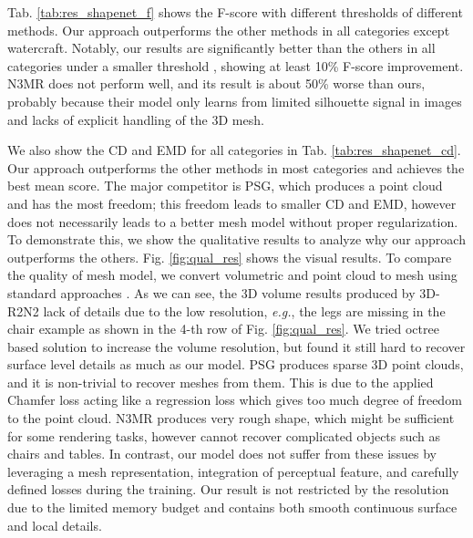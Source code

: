 \documentclass[runningheads]{llncs}
\def\eg{\emph{e.g.}}
\newcommand{\figref}[1]{Fig. \ref{#1}}
\newcommand{\tabref}[1]{Tab. \ref{#1}}
\begin{document}
\tabref{tab:res_shapenet_f} shows the F-score with different thresholds of different methods. Our approach outperforms the other methods in all categories except watercraft. Notably, our results are significantly better than the others in all categories under a smaller threshold , showing at least 10\% F-score improvement.
N3MR does not perform well, and its result is about 50\% worse than ours, probably because their model only learns from limited silhouette signal in images and lacks of explicit handling of the 3D mesh.



We also show the CD and EMD for all categories in \tabref{tab:res_shapenet_cd}. Our approach outperforms the other methods in most categories and achieves the best mean score. The major competitor is PSG, which produces a point cloud and has the most freedom; this freedom leads to smaller CD and EMD, however does not necessarily leads to a better mesh model without proper regularization. To demonstrate this, we show the qualitative results to analyze why our approach outperforms the others.
\figref{fig:qual_res} shows the visual results. To compare the quality of mesh model, we convert volumetric and point cloud to mesh using standard approaches \cite{LorensenC87,BernardiniMRST99}. As we can see, the 3D volume results produced by 3D-R2N2 lack of details due to the low resolution, \eg, the legs are missing in the chair example as shown in the 4-th row of \figref{fig:qual_res}. We tried octree based solution \cite{TatarchenkoDB17} to increase the volume resolution, but found it still hard to recover surface level details as much as our model. PSG produces sparse 3D point clouds, and it is non-trivial to recover meshes from them.
This is due to the applied Chamfer loss acting like a regression loss which gives too much degree of freedom to the point cloud. N3MR produces very rough shape, which might be sufficient for some rendering tasks, however cannot recover complicated objects such as chairs and tables. 
In contrast, our model does not suffer from these issues by leveraging a mesh representation, integration of perceptual feature, and carefully defined losses during the training. Our result is not restricted by the resolution due to the limited memory budget and contains both smooth continuous surface and local details.
\end{document}
